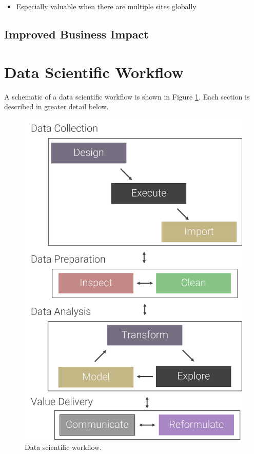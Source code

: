 \documentclass[
]{book}
\providecommand{\tightlist}{%
  \setlength{\itemsep}{0pt}\setlength{\parskip}{0pt}}
\begin{document}
\begin{itemize}
\tightlist
\item
  Especially valuable when there are multiple sites globally
\end{itemize}

\hypertarget{improved-business-impact}{%
\subsection{Improved Business Impact}\label{improved-business-impact}}

\hypertarget{data-scientific-workflow}{%
\section{Data Scientific Workflow}\label{data-scientific-workflow}}

A schematic of a data scientific workflow is shown in Figure \ref{fig:ds-workflow}. Each section is described in greater detail below.

\begin{figure}

{\centering \includegraphics[width=17.38in]{images/data_science_workflow} 

}

\caption{Data scientific workflow.}\label{fig:ds-workflow}
\end{figure}
\end{document}
